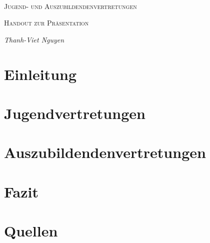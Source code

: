 \documentclass[
  a4paper,            %
  DIV=10,             %
  oneside,            %
  BCOR=5mm,           %
  parskip=half,       %
  numbers=noenddot    %
]{scrartcl}
\begin{document}
\begin{titlepage}
	\centering
	\text{}\vspace{3cm} \\
	{\scshape\LARGE Jugend- und Auszubildendenvertretungen \par}
	\vspace{1cm}
	{\scshape\Large 
		Handout zur Präsentation \par}
	\vspace{1.5cm}
	{\huge\bfseries \par}
	\vspace{2cm}
	{\Large\itshape     	
            Thanh-Viet Nguyen \\
            \par}
\vfill
\begingroup
{}		
        \textbf {} %
\endgroup
\end{titlepage}

    \tableofcontents
\clearpage


\section{Einleitung} \label{sec:intro}
    
\section{Jugendvertretungen} 
    
\section{Auszubildendenvertretungen} 


\newpage

\section{Fazit} \label{conclusion}
  
\section{Quellen}

%
%

\clearpage
\end{document}

